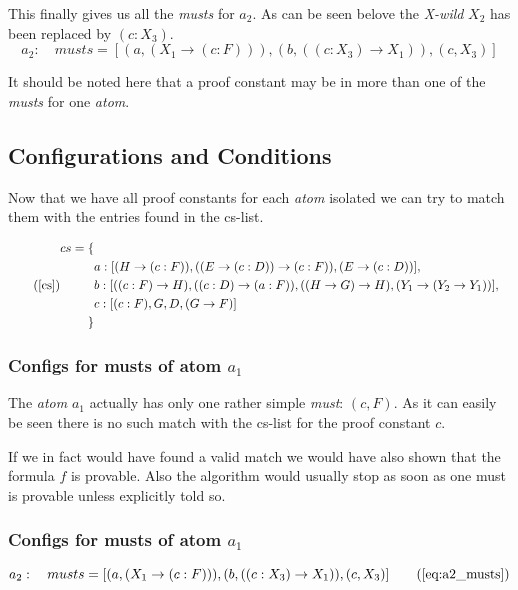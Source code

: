 This finally gives us all the \emph{musts} for $a_2$. As can be seen belove the \emph{X-wild} $X_2$ has been replaced by $(c:X_3)$.
\begin{equation}\label{eq:a2_musts}
	a_2: \quad musts = [(a, (X_1 \rightarrow (c:F))), (b, ((c:X_3) \rightarrow X_1)), (c, X_3)]
\end{equation}

It should be noted here that a proof constant may be in more than one of the \emph{musts} for one \emph{atom}. 

\subsection{Configurations and Conditions}
Now that we have all proof constants for each \emph{atom} isolated we can try to match them with the entries found in the cs-list.

\begin{equation*}
\tag{\ref{cs}}
\begin{split}
	cs = \{\\
	& a: [(H \rightarrow (c:F)), ((E \rightarrow (c:D)) \rightarrow (c:F)), (E \rightarrow (c:D))],\\
	& b: [((c:F) \rightarrow H), ((c:D) \rightarrow (a:F)), ((H \rightarrow G) \rightarrow H), (Y_1 \rightarrow (Y_2 \rightarrow Y_1))],\\
	& c: [(c:F), G, D, (G \rightarrow F)] \\
	\}
\end{split}
\end{equation*}

\subsubsection[Config for a1]{Configs for musts of atom $a_1$}
The \emph{atom} $a_1$ actually has only one rather simple \emph{must}: $(c,F)$. As it can easily be seen there is no such match with the cs-list for the proof constant $c$.

If we in fact would have found a valid match we would have also shown that the formula $f$ is provable. Also the algorithm would usually stop as soon as one must is provable unless explicitly told so.

\subsubsection[Config for a2]{Configs for musts of atom $a_1$}

\begin{equation*}
	a_2: \quad musts = [(a, (X_1 \rightarrow (c:F))), (b, ((c:X_3) \rightarrow X_1)), (c, X_3)]
	\tag{\ref{eq:a2_musts}}
\end{equation*}

